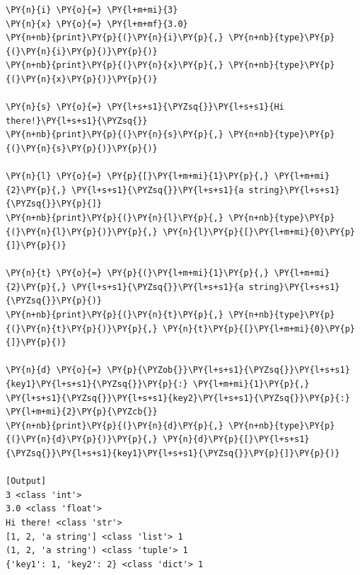 \begin{Verbatim}[label=\makebox{\url{https://github.com/lucabaldini/cmepda/tree/master/slides/latex/snippets/basic\_types.py}},commandchars=\\\{\}]
\PY{n}{i} \PY{o}{=} \PY{l+m+mi}{3}
\PY{n}{x} \PY{o}{=} \PY{l+m+mf}{3.0}
\PY{n+nb}{print}\PY{p}{(}\PY{n}{i}\PY{p}{,} \PY{n+nb}{type}\PY{p}{(}\PY{n}{i}\PY{p}{)}\PY{p}{)}
\PY{n+nb}{print}\PY{p}{(}\PY{n}{x}\PY{p}{,} \PY{n+nb}{type}\PY{p}{(}\PY{n}{x}\PY{p}{)}\PY{p}{)}

\PY{n}{s} \PY{o}{=} \PY{l+s+s1}{\PYZsq{}}\PY{l+s+s1}{Hi there!}\PY{l+s+s1}{\PYZsq{}}
\PY{n+nb}{print}\PY{p}{(}\PY{n}{s}\PY{p}{,} \PY{n+nb}{type}\PY{p}{(}\PY{n}{s}\PY{p}{)}\PY{p}{)}

\PY{n}{l} \PY{o}{=} \PY{p}{[}\PY{l+m+mi}{1}\PY{p}{,} \PY{l+m+mi}{2}\PY{p}{,} \PY{l+s+s1}{\PYZsq{}}\PY{l+s+s1}{a string}\PY{l+s+s1}{\PYZsq{}}\PY{p}{]}
\PY{n+nb}{print}\PY{p}{(}\PY{n}{l}\PY{p}{,} \PY{n+nb}{type}\PY{p}{(}\PY{n}{l}\PY{p}{)}\PY{p}{,} \PY{n}{l}\PY{p}{[}\PY{l+m+mi}{0}\PY{p}{]}\PY{p}{)}

\PY{n}{t} \PY{o}{=} \PY{p}{(}\PY{l+m+mi}{1}\PY{p}{,} \PY{l+m+mi}{2}\PY{p}{,} \PY{l+s+s1}{\PYZsq{}}\PY{l+s+s1}{a string}\PY{l+s+s1}{\PYZsq{}}\PY{p}{)}
\PY{n+nb}{print}\PY{p}{(}\PY{n}{t}\PY{p}{,} \PY{n+nb}{type}\PY{p}{(}\PY{n}{t}\PY{p}{)}\PY{p}{,} \PY{n}{t}\PY{p}{[}\PY{l+m+mi}{0}\PY{p}{]}\PY{p}{)}

\PY{n}{d} \PY{o}{=} \PY{p}{\PYZob{}}\PY{l+s+s1}{\PYZsq{}}\PY{l+s+s1}{key1}\PY{l+s+s1}{\PYZsq{}}\PY{p}{:} \PY{l+m+mi}{1}\PY{p}{,} \PY{l+s+s1}{\PYZsq{}}\PY{l+s+s1}{key2}\PY{l+s+s1}{\PYZsq{}}\PY{p}{:} \PY{l+m+mi}{2}\PY{p}{\PYZcb{}}
\PY{n+nb}{print}\PY{p}{(}\PY{n}{d}\PY{p}{,} \PY{n+nb}{type}\PY{p}{(}\PY{n}{d}\PY{p}{)}\PY{p}{,} \PY{n}{d}\PY{p}{[}\PY{l+s+s1}{\PYZsq{}}\PY{l+s+s1}{key1}\PY{l+s+s1}{\PYZsq{}}\PY{p}{]}\PY{p}{)}

[Output]
3 <class 'int'>
3.0 <class 'float'>
Hi there! <class 'str'>
[1, 2, 'a string'] <class 'list'> 1
(1, 2, 'a string') <class 'tuple'> 1
{'key1': 1, 'key2': 2} <class 'dict'> 1
\end{Verbatim}